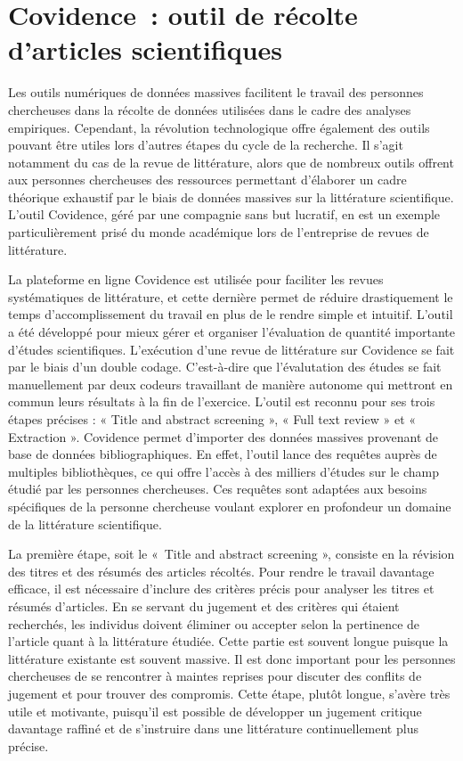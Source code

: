 \documentclass[
  letterpaper,
]{scrbook}
\begin{document}
\hypertarget{covidence-outil-de-ruxe9colte-darticles-scientifiques}{%
\section{\texorpdfstring{\textbf{Covidence~: outil de récolte d'articles
scientifiques}}{Covidence~: outil de récolte d'articles scientifiques}}\label{covidence-outil-de-ruxe9colte-darticles-scientifiques}}

Les outils numériques de données massives facilitent le travail des
personnes chercheuses dans la récolte de données utilisées dans le cadre
des analyses empiriques. Cependant, la révolution technologique offre
également des outils pouvant être utiles lors d'autres étapes du cycle
de la recherche. Il s'agit notamment du cas de la revue de littérature,
alors que de nombreux outils offrent aux personnes chercheuses des
ressources permettant d'élaborer un cadre théorique exhaustif par le
biais de données massives sur la littérature scientifique. L'outil
Covidence, géré par une compagnie sans but lucratif, en est un exemple
particulièrement prisé du monde académique lors de l'entreprise de
revues de littérature.

La plateforme en ligne Covidence est utilisée pour faciliter les revues
systématiques de littérature, et cette dernière permet de réduire
drastiquement le temps d'accomplissement du travail en plus de le rendre
simple et intuitif. L'outil a été développé pour mieux gérer et
organiser l'évaluation de quantité importante d'études scientifiques.
L'exécution d'une revue de littérature sur Covidence se fait par le
biais d'un double codage. C'est-à-dire que l'évalutation des études se
fait manuellement par deux codeurs travaillant de manière autonome qui
mettront en commun leurs résultats à la fin de l'exercice. L'outil est
reconnu pour ses trois étapes précises : « Title and abstract screening
», « Full text review » et « Extraction ». Covidence permet d'importer
des données massives provenant de base de données bibliographiques. En
effet, l'outil lance des requêtes auprès de multiples bibliothèques, ce
qui offre l'accès à des milliers d'études sur le champ étudié par les
personnes chercheuses. Ces requêtes sont adaptées aux besoins
spécifiques de la personne chercheuse voulant explorer en profondeur un
domaine de la littérature scientifique.

La première étape, soit le «~Title and abstract screening », consiste en
la révision des titres et des résumés des articles récoltés. Pour rendre
le travail davantage efficace, il est nécessaire d'inclure des critères
précis pour analyser les titres et résumés d'articles. En se servant du
jugement et des critères qui étaient recherchés, les individus doivent
éliminer ou accepter selon la pertinence de l'article quant à la
littérature étudiée. Cette partie est souvent longue puisque la
littérature existante est souvent massive. Il est donc important pour
les personnes chercheuses de se rencontrer à maintes reprises pour
discuter des conflits de jugement et pour trouver des compromis. Cette
étape, plutôt longue, s'avère très utile et motivante, puisqu'il est
possible de développer un jugement critique davantage raffiné et de
s'instruire dans une littérature continuellement plus précise.
\end{document}
